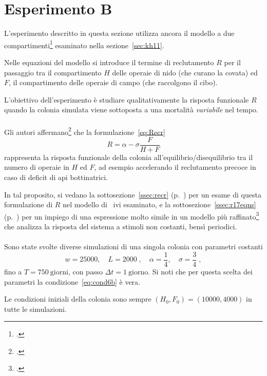 \section{Esperimento B}
L'esperimento descritto in questa sezione utilizza ancora il modello a due compartimenti\footcite{khoury2011}
esaminato nella sezione~\ref{sec:kh11}.

Nelle equazioni del modello si introduce il termine di reclutamento $R$ per il passaggio tra il compartimento $H$ delle
operaie di nido (che curano la covata) ed $F$, il compartimento delle operaie di campo (che raccolgono il cibo).

L'obiettivo dell'esperimento è studiare qualitativamente la risposta funzionale $R$ quando la colonia simulata viene
sottoposta a una mortalità \emph{variabile} nel tempo.

\paragraph{}
Gli autori affermano\footcite[2,3]{khoury2011} che la formulazione~\eqref{eq:Recr}
$$R = \alpha - \sigma \frac{F}{H+F}$$
rappresenta la risposta funzionale della colonia all'equilibrio/disequilibrio tra il numero di operaie in $H$ ed $F$,
ad esempio accelerando il reclutamento precoce in caso di deficit di api bottinatrici.

In tal proposito, si vedano la sottosezione~\ref{ssec:recr} (p.~\pageref{ssec:recr}) per un esame di questa formulazione
di $R$ nel modello di~\citeauthor{khoury2011} ivi esaminato, e la sottosezione~\ref{ssec:r17eqns}
(p.~\pageref{ssec:r17eqns})
per un impiego di una espressione molto simile in un modello più raffinato\footcite{ratti2017} che analizza
la risposta del sistema a stimoli non costanti, bensì periodici.

\paragraph{}
Sono state svolte diverse simulazioni di una singola colonia con parametri costanti
$$w= 25000, \quad L=2000 \; , \quad \alpha=\frac{1}{4}, \quad \sigma= \frac{3}{4} \; ,$$
fino a $T=750~\text{giorni}$, con passo $\Delta t = 1~\text{giorno}$.
Si noti che per questa scelta dei parametri la condizione~\eqref{eq:cond6b} è vera.

Le condizioni iniziali della colonia sono sempre $(H_0, F_0) = (10000, 4000)$ in tutte le simulazioni.

